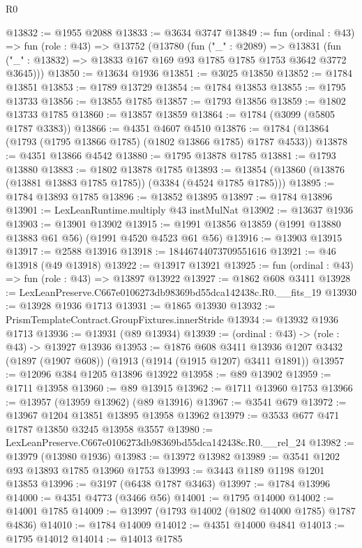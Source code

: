 \begin{lexlean}{R0}
\begin{coremodule}
@13832 := @1955 @2088
@13833 := @3634 @3747
@13849 := fun (ordinal : @43) =>
  fun (role : @43) =>
  @13752
    (@13780
      (fun ("_" : @2089) =>
      @13831 (fun ("_" : @13832) => @13833 @167 @169 @93 @1785 @1785 @1753 @3642 @3772 @3645)))
@13850 := @13634 @1936
@13851 := @3025 @13850
@13852 := @1784 @13851
@13853 := @1789 @13729
@13854 := @1784 @13853
@13855 := @1795 @13733
@13856 := @13855 @1785
@13857 := @1793 @13856
@13859 := @1802 @13733 @1785
@13860 := @13857 @13859
@13864 := @1784 (@3099 (@5805 @1787 @3383))
@13866 := @4351 @4607 @4510
@13876 := @1784 (@13864 (@1793 (@1795 @13866 @1785) (@1802 @13866 @1785) @1787 @4533))
@13878 := @4351 @13866 @4542
@13880 := @1795 @13878 @1785
@13881 := @1793 @13880
@13883 := @1802 @13878 @1785
@13893 := @13854 (@13860 (@13876 (@13881 @13883 @1785 @1785)) (@3384 (@4524 @1785 @1785)))
@13895 := @1784 @13893 @1785
@13896 := @13852 @13895
@13897 := @1784 @13896
@13901 := LexLeanRuntime.multiply @43 instMulNat
@13902 := @13637 @1936
@13903 := @13901 @13902
@13915 := @1991 @13856 @13859 (@1991 @13880 @13883 @61 @56) (@1991 @4520 @4523 @61 @56)
@13916 := @13903 @13915
@13917 := @2588 @13916
@13918 := 18446744073709551616
@13921 := @46 @13918 (@49 @13918)
@13922 := @13917 @13921
@13925 := fun (ordinal : @43) => fun (role : @43) => @13897 @13922
@13927 := @1862 @608 @3411
@13928 := LexLeanPreserve.C667e0106273db98369bd55dca142438c.R0.__fits_19
@13930 := @13928 @1936 @1713
@13931 := @1865 @13930
@13932 := PrismTemplateContract.GroupFixtures.innerStride
@13934 := @13932 @1936 @1713
@13936 := @13931 (@89 @13934)
@13939 := (ordinal : @43) -> (role : @43) -> @13927 @13936
@13953 := @1876
    @608
    @3411
    @13936
    @1207
    @3432
    (@1897 (@1907 @608))
    (@1913 (@1914 (@1915 @1207) @3411 @1891))
@13957 := @12096 @384 @1205 @13896 @13922
@13958 := @89 @13902
@13959 := @1711 @13958
@13960 := @89 @13915
@13962 := @1711 @13960 @1753
@13966 := @13957 (@13959 @13962) (@89 @13916)
@13967 := @3541 @679
@13972 := @13967 @1204 @13851 @13895 @13958 @13962
@13979 := @3533 @677 @471 @1787 @13850 @3245 @13958 @3557
@13980 := LexLeanPreserve.C667e0106273db98369bd55dca142438c.R0.__rel_24
@13982 := @13979 (@13980 @1936)
@13983 := @13972 @13982
@13989 := @3541 @1202 @93 @13893 @1785 @13960 @1753
@13993 := @3443 @1189 @1198 @1201 @13853
@13996 := @3197 (@6438 @1787 @3463)
@13997 := @1784 @13996
@14000 := @4351 @4773 (@3466 @56)
@14001 := @1795 @14000
@14002 := @14001 @1785
@14009 := @13997 (@1793 @14002 (@1802 @14000 @1785) @1787 @4836)
@14010 := @1784 @14009
@14012 := @4351 @14000 @4841
@14013 := @1795 @14012
@14014 := @14013 @1785

\end{coremodule}
\end{lexlean}
